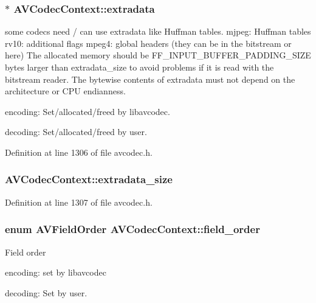 \subsubsection[{\texorpdfstring{extradata}{extradata}}]{$\ast$ A\+V\+Codec\+Context\+::extradata}\hypertarget{struct_a_v_codec_context_abe964316aaaa61967b012efdcced79c4}{}\label{struct_a_v_codec_context_abe964316aaaa61967b012efdcced79c4}
some codecs need / can use extradata like Huffman tables. mjpeg\+: Huffman tables rv10\+: additional flags mpeg4\+: global headers (they can be in the bitstream or here) The allocated memory should be F\+F\+\_\+\+I\+N\+P\+U\+T\+\_\+\+B\+U\+F\+F\+E\+R\+\_\+\+P\+A\+D\+D\+I\+N\+G\+\_\+\+S\+I\+ZE bytes larger than extradata\+\_\+size to avoid problems if it is read with the bitstream reader. The bytewise contents of extradata must not depend on the architecture or C\+PU endianness.
\begin{DoxyItemize}
\item encoding\+: Set/allocated/freed by libavcodec.
\item decoding\+: Set/allocated/freed by user. 
\end{DoxyItemize}

Definition at line 1306 of file avcodec.\+h.

\subsubsection[{\texorpdfstring{extradata\+\_\+size}{extradata_size}}]{ A\+V\+Codec\+Context\+::extradata\+\_\+size}\hypertarget{struct_a_v_codec_context_ae246ca7a1c72c151891ed0599e8dbfba}{}\label{struct_a_v_codec_context_ae246ca7a1c72c151891ed0599e8dbfba}


Definition at line 1307 of file avcodec.\+h.

\subsubsection[{\texorpdfstring{field\+\_\+order}{field_order}}]{\setlength{\rightskip}{0pt plus 5cm}enum {\bf A\+V\+Field\+Order} A\+V\+Codec\+Context\+::field\+\_\+order}\hypertarget{struct_a_v_codec_context_a5d222eeeb0b54ab462af363bcb9273bc}{}\label{struct_a_v_codec_context_a5d222eeeb0b54ab462af363bcb9273bc}
Field order
\begin{DoxyItemize}
\item encoding\+: set by libavcodec
\item decoding\+: Set by user. 
\end{DoxyItemize}

